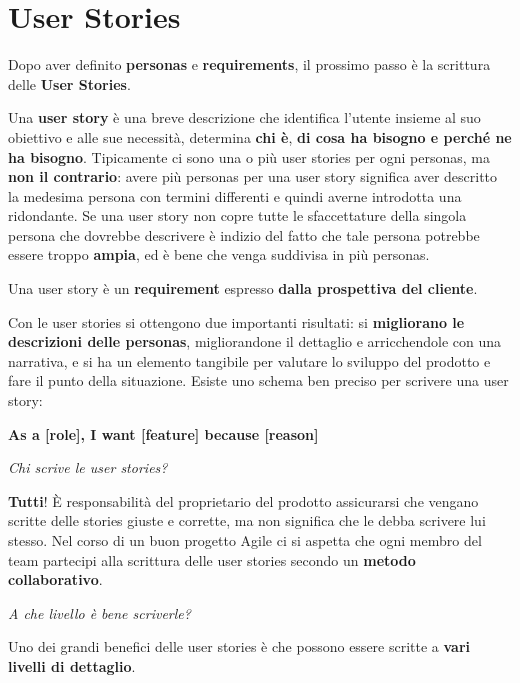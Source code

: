 \section{User Stories}
Dopo aver definito \textbf{personas} e \textbf{requirements}, il prossimo passo è la scrittura delle \textbf{User Stories}.

Una \textbf{user story} è una breve descrizione che identifica l'utente insieme al suo
obiettivo e alle sue necessità, determina \textbf{chi è}, \textbf{di cosa ha bisogno e perché ne ha bisogno}. Tipicamente ci sono una o più user stories per ogni personas, ma \textbf{non il contrario}: avere più personas per una user story significa aver descritto la medesima persona con termini differenti e quindi averne introdotta una ridondante.
Se una user story non copre tutte le sfaccettature della singola persona che dovrebbe descrivere è indizio del fatto che tale persona potrebbe essere troppo \textbf{ampia}, ed è bene che venga suddivisa in più personas.

Una user story è un \textbf{requirement} espresso \textbf{dalla prospettiva del cliente}.

Con le user stories si ottengono due importanti risultati: si \textbf{migliorano le descrizioni delle personas}, migliorandone il dettaglio e arricchendole con una narrativa, e si ha un elemento tangibile per valutare lo sviluppo del prodotto e fare il punto della situazione.
Esiste uno schema ben preciso per scrivere una user story:

\begin{center}
	\textbf{\large As a [role], I want [feature] because [reason]}
\end{center}

\begin{flushleft}
	\textit{Chi scrive le user stories?}
\end{flushleft}

\textbf{Tutti}! È responsabilità del proprietario del prodotto assicurarsi che vengano scritte delle stories giuste e corrette, ma non significa che le debba
scrivere lui stesso. Nel corso di un buon progetto Agile ci si aspetta che ogni membro del team partecipi alla scrittura delle user stories secondo un \textbf{metodo collaborativo}.

\pagebreak

\begin{flushleft}
	\textit{A che livello è bene scriverle?}
\end{flushleft}

Uno dei grandi benefici delle user stories è che possono essere
scritte a \textbf{vari livelli di dettaglio}.

